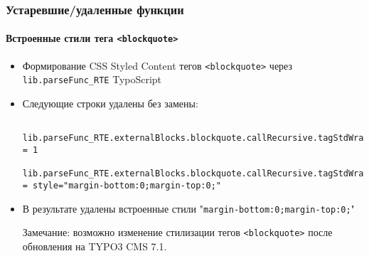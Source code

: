
\begin{frame}[fragile]
	\frametitle{Устаревшие/удаленные функции}
	\framesubtitle{Встроенные стили тега \texttt{<blockquote>}}

	\lstset{basicstyle=\tiny\ttfamily}

	\begin{itemize}

		\item Формирование CSS Styled Content тегов \texttt{<blockquote>} через \texttt{lib.parseFunc\_RTE} TypoScript
		\item Следующие строки удалены без замены:

			\begin{lstlisting}
				lib.parseFunc_RTE.externalBlocks.blockquote.callRecursive.tagStdWrap.HTMLparser = 1
				lib.parseFunc_RTE.externalBlocks.blockquote.callRecursive.tagStdWrap.HTMLparser.tags.blockquote.overrideAttribs = style="margin-bottom:0;margin-top:0;"
			\end{lstlisting}

		\item В результате удалены встроенные стили\newline
			"\texttt{margin-bottom:0;margin-top:0;}"

			\vspace{0.2cm}

			\begingroup
				\color{red}
					Замечание: возможно изменение стилизации тегов \texttt{<blockquote>} после
					обновления на TYPO3 CMS 7.1.
			\endgroup

	\end{itemize}

\end{frame}


